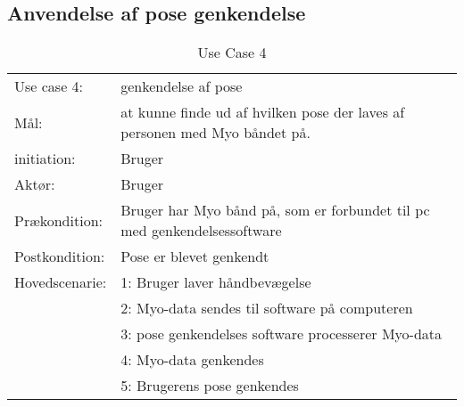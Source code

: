 \subsection{Anvendelse af pose genkendelse}
\begin{center}
	\begin{table}[htbp]
		\begin{tabular}{lp{10cm}}
			\rowcolor{grey} Use case 4:		& genkendelse af pose\\
			Mål: & at kunne finde ud af hvilken pose der laves af personen med Myo båndet på. \\
			initiation:	& Bruger \\
			Aktør: & Bruger\\
			Prækondition: & Bruger har Myo bånd på, som er forbundet til pc med genkendelsessoftware \\
			Postkondition: & Pose er blevet genkendt \\
			Hovedscenarie: & 1: Bruger laver håndbevægelse \\
			& 2: Myo-data sendes til software på computeren\\
			& 3: pose genkendelses software processerer Myo-data\\
			& 4: Myo-data genkendes\\
			& 5: Brugerens pose genkendes\\
		\end{tabular}
		\caption{Use Case 4}
	\end{table}
\end{center}
\egroup